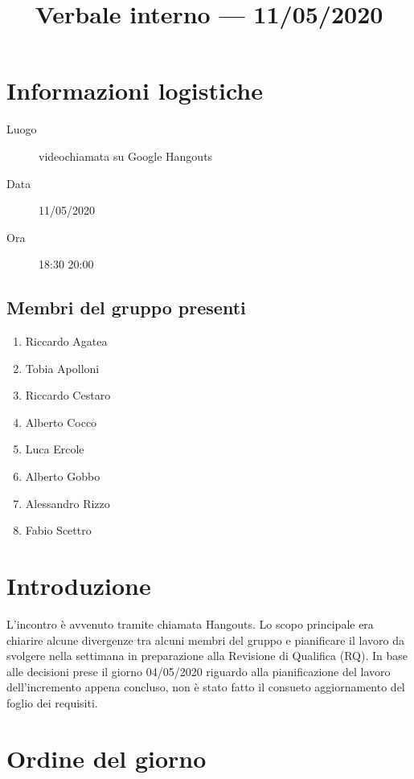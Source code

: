 \documentclass{article}
\title{Verbale interno --- 11/05/2020}
\begin{document}


\section{Informazioni logistiche}%
\label{sec:informazioni_logistiche}

\begin{description}
  \item [Luogo] videochiamata su Google Hangouts
  \item [Data] 11/05/2020
  \item [Ora] 18:30  20:00
\end{description}

\subsection{Membri del gruppo presenti}%
\label{sub:membri_del_gruppo_presenti}

\begin{enumerate}
  \item Riccardo Agatea
  \item Tobia Apolloni
  \item Riccardo Cestaro
  \item Alberto Cocco
  \item Luca Ercole
  \item Alberto Gobbo
  \item Alessandro Rizzo
  \item Fabio Scettro
\end{enumerate}

\section{Introduzione}%
\label{sec:introduzione}
L'incontro è avvenuto tramite chiamata Hangouts.
Lo scopo principale era chiarire alcune divergenze tra alcuni membri del gruppo e pianificare il lavoro da svolgere nella settimana in preparazione alla Revisione di Qualifica (RQ).
In base alle decisioni prese il giorno 04/05/2020 riguardo alla pianificazione del lavoro dell'incremento appena concluso, non è stato fatto il consueto aggiornamento del foglio dei requisiti.

\section{Ordine del giorno}%
\label{sec:ordine_del_giorno}
\end{document}
